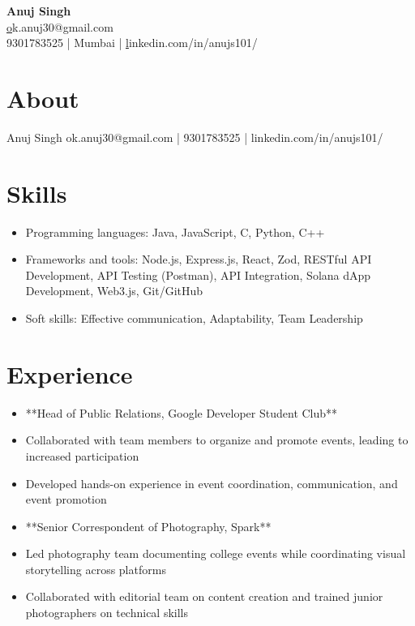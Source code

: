 \documentclass[10pt]{article}
\begin{document}
\begin{center}
    {\Huge \textbf{ Anuj Singh }}\\
    \vspace{0.2cm}
    \href{mailto:ok.anuj30@gmail.com}ok.anuj30@gmail.com \\
    9301783525 | Mumbai | \href{https://linkedin.com/in/anujs101/}linkedin.com/in/anujs101/
\end{center}

\section*{About}
Anuj Singh ok.anuj30@gmail.com | 9301783525 | linkedin.com/in/anujs101/


\section*{Skills}
\begin{itemize}[leftmargin=*]

  \item Programming languages: Java, JavaScript, C, Python, C++

  \item Frameworks and tools: Node.js, Express.js, React, Zod, RESTful API Development, API Testing (Postman), API Integration, Solana dApp Development, Web3.js, Git/GitHub

  \item Soft skills: Effective communication, Adaptability, Team Leadership

\end{itemize}



\section*{Experience}
\begin{itemize}[leftmargin=*]

  \item **Head of Public Relations, Google Developer Student Club**

  \item Collaborated with team members to organize and promote events, leading to increased participation

  \item Developed hands-on experience in event coordination, communication, and event promotion

  \item **Senior Correspondent of Photography, Spark**

  \item Led photography team documenting college events while coordinating visual storytelling across platforms

  \item Collaborated with editorial team on content creation and trained junior photographers on technical skills

\end{itemize}
\end{document}

